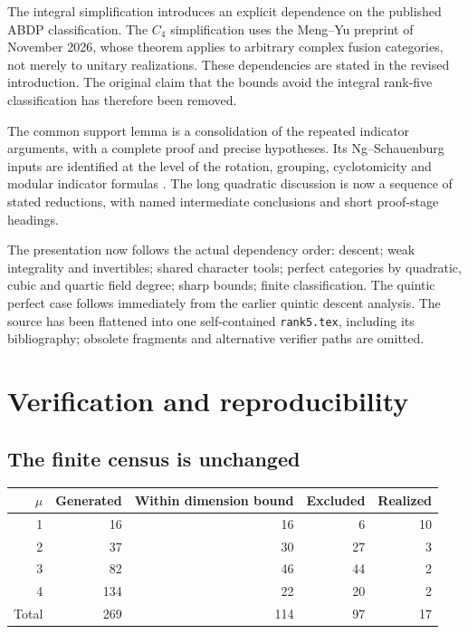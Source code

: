 \documentclass[11pt,a4paper]{article}
\newcommand{\issue}[1]{\subsection{#1}}
\begin{document}
The integral simplification introduces an explicit dependence on the
published ABDP classification. The \(C_4\) simplification uses the
Meng--Yu preprint of November 2026, whose theorem applies to arbitrary
complex fusion categories, not merely to unitary realizations.
These dependencies are stated in the revised introduction. The original
claim that the bounds avoid the integral rank-five classification has
therefore been removed.

The common support lemma is a consolidation of the repeated indicator
arguments, with a complete proof and precise hypotheses. Its
Ng--Schauenburg inputs are identified at the level of the rotation,
grouping, cyclotomicity and modular indicator formulas \cite{NS}.
The long quadratic discussion is now a sequence of stated reductions,
with named intermediate conclusions and short proof-stage headings.

The presentation now follows the actual dependency order: descent;
weak integrality and invertibles; shared character tools; perfect
categories by quadratic, cubic and quartic field degree; sharp bounds;
finite classification. The quintic perfect case follows immediately
from the earlier quintic descent analysis. The source has been flattened
into one self-contained \texttt{rank5.tex}, including its bibliography;
obsolete fragments and alternative verifier paths are omitted.

\section{Verification and reproducibility}

\issue{The finite census is unchanged}

\begin{center}
\begin{tabular}{@{}rrrrr@{}}
\toprule
\(\mu\) & Generated & Within dimension bound & Excluded & Realized\\
\midrule
1 & 16 & 16 & 6 & 10\\
2 & 37 & 30 & 27 & 3\\
3 & 82 & 46 & 44 & 2\\
4 & 134 & 22 & 20 & 2\\
\midrule
Total & 269 & 114 & 97 & 17\\
\bottomrule
\end{tabular}
\end{center}
\end{document}
